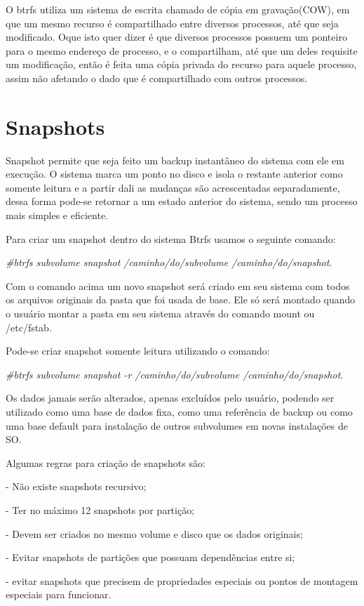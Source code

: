 \documentclass[12pt]{article}
\begin{document}
O btrfs utiliza um sistema de escrita chamado de cópia em gravação(COW), em que um mesmo recurso é compartilhado entre diversos processos, até que seja modificado. Oque isto quer dizer é que diversos processos possuem um ponteiro para o mesmo endereço de processo, e o compartilham, até que um deles requisite um modificação, então é feita uma cópia privada do recurso para aquele processo, assim não afetando o dado que é compartilhado com outros processos. 
 
\section{Snapshots}

Snapshot permite que seja feito um backup instantâneo do sistema com ele em execução. O sistema marca um ponto no disco e isola o restante anterior como somente leitura e a partir dali as mudanças são acrescentadas separadamente, dessa forma pode-se retornar a um estado anterior do sistema, sendo um processo mais simples e eficiente.

Para criar um snapshot dentro do sistema Btrfs usamos o seguinte comando:

\textit{#btrfs subvolume snapshot /caminho/do/subvolume /caminho/do/snapshot}.

Com o comando acima um novo snapshot será criado em seu sistema com todos os arquivos originais da pasta que foi usada de base. Ele só será montado quando o usuário montar a pasta em seu sistema através do comando mount ou /etc/fstab.

Pode-se criar snapshot somente leitura utilizando o comando:

\textit{#btrfs subvolume snapshot -r /caminho/do/subvolume /caminho/do/snapshot}.

Os dados jamais serão alterados, apenas excluídos pelo usuário, podendo ser utilizado como uma base de dados fixa, como uma referência de backup ou como uma base default para instalação de outros subvolumes em novas instalações de SO.

Algumas regras para criação de snapshots são:

- Não existe snapshots recursivo;

- Ter no máximo 12 snapshots por partição;

- Devem ser criados no mesmo volume e disco que os dados originais;

- Evitar snapshots de partições que possuam dependências entre si;

- evitar snapshots que precisem de propriedades especiais ou pontos de montagem especiais para funcionar.
\end{document}
